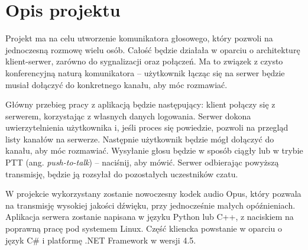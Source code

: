 \section{Opis projektu}
Projekt ma na celu utworzenie komunikatora głosowego, który pozwoli na jednoczesną rozmowę wielu osób. Całość będzie działała w oparciu o architekturę klient-serwer, zarówno do sygnalizacji oraz połączeń. Ma to związek z czysto konferencyjną naturą komunikatora -- użytkownik łącząc się na serwer będzie musiał dołączyć do konkretnego kanału, aby móc rozmawiać.

Główny przebieg pracy z aplikacją będzie następujący: klient połączy się z serwerem, korzystając z własnych danych logowania. Serwer dokona uwierzytelnienia użytkownika i, jeśli proces się powiedzie, pozwoli na przegląd listy kanałów na serwerze. Następnie użytkownik będzie mógł dołączyć do kanału, aby móc rozmawiać. Wysyłanie głosu będzie w sposób ciągły lub w trybie PTT (ang. \textit{push-to-talk}) -- naciśnij, aby mówić. Serwer odbierając powyższą transmisję, będzie ją rozsyłał do pozostałych uczestników czatu.

W projekcie wykorzystany zostanie nowoczesny kodek audio Opus, który pozwala na transmisję wysokiej jakości dźwięku, przy jednocześnie małych opóźnieniach. Aplikacja serwera zostanie napisana w języku Python lub C++, z naciskiem na poprawną pracę pod systemem Linux. Część kliencka powstanie w oparciu o język C\# i platformę .NET Framework w wersji 4.5.
